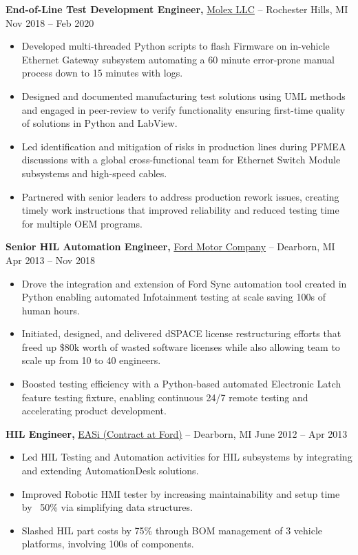 \documentclass[11pt]{article}       %
\begin{document}
\hfill \break
\hfill \break

\textbf{End-of-Line Test Development Engineer,} \href{}{Molex LLC} -- Rochester Hills, MI \hfill Nov 2018 -- Feb 2020 \\
\vspace{-9pt}
\begin{itemize}
  \item Developed multi-threaded Python scripts to flash Firmware on in-vehicle Ethernet Gateway subsystem automating a 60 minute error-prone manual process down to 15 minutes with logs.
  \item Designed and documented manufacturing test solutions using UML methods and engaged in peer-review to verify functionality ensuring first-time quality of solutions in Python and LabView.
  \item Led identification and mitigation of risks in production lines during PFMEA discussions with a global cross-functional team for Ethernet Switch Module subsystems and high-speed cables.
  \item Partnered with senior leaders to address production rework issues, creating timely work instructions that improved reliability and reduced testing time for multiple OEM programs.
\end{itemize}

\textbf{Senior HIL Automation Engineer,} \href{}{Ford Motor Company} -- Dearborn, MI \hfill Apr 2013 -- Nov 2018 \\
\vspace{-9pt}
\begin{itemize}
  \item Drove the integration and extension of Ford Sync automation tool created in Python enabling automated Infotainment testing at scale saving 100s of human hours.
  \item Initiated, designed, and delivered dSPACE license restructuring efforts that freed up \$80k worth of wasted software licenses while also allowing team to scale up from 10 to 40 engineers.
  \item Boosted testing efficiency with a Python-based automated Electronic Latch feature testing fixture, enabling continuous 24/7 remote testing and accelerating product development.
\end{itemize}

\textbf{HIL Engineer,} \href{}{EASi (Contract at Ford)} -- Dearborn, MI \hfill June 2012 -- Apr 2013 \\
\vspace{-9pt}
\begin{itemize}
  \item Led HIL Testing and Automation activities for HIL subsystems by integrating and extending AutomationDesk solutions.
  \item Improved Robotic HMI tester by increasing maintainability and setup time by ~50\% via simplifying data structures.
  \item Slashed HIL part costs by 75\% through BOM management of 3 vehicle platforms, involving 100s of components.
\end{itemize}
\end{document}
